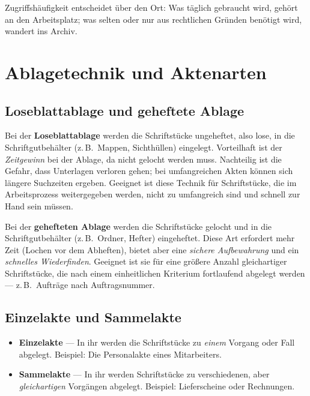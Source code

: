 \documentclass[11pt, a4paper]{article}
\begin{document}
\begin{merksatz}
Zugriffshäufigkeit entscheidet über den Ort: Was täglich gebraucht wird, gehört an den
Arbeitsplatz; was selten oder nur aus rechtlichen Gründen benötigt wird, wandert ins
Archiv.
\end{merksatz}

\section{Ablagetechnik und Aktenarten}

\subsection{Loseblattablage und geheftete Ablage}

Bei der \textbf{Loseblattablage} werden die Schriftstücke ungeheftet, also lose, in die
Schriftgutbehälter (z.\,B.\ Mappen, Sichthüllen) eingelegt. Vorteilhaft ist der
\emph{Zeitgewinn} bei der Ablage, da nicht gelocht werden muss. Nachteilig ist die Gefahr,
dass Unterlagen verloren gehen; bei umfangreichen Akten können sich längere Suchzeiten
ergeben. Geeignet ist diese Technik für Schriftstücke, die im Arbeitsprozess
weitergegeben werden, nicht zu umfangreich sind und schnell zur Hand sein müssen.

Bei der \textbf{gehefteten Ablage} werden die Schriftstücke gelocht und in die
Schriftgutbehälter (z.\,B.\ Ordner, Hefter) eingeheftet. Diese Art erfordert mehr Zeit
(Lochen vor dem Abheften), bietet aber eine \emph{sichere Aufbewahrung} und ein
\emph{schnelles Wiederfinden}. Geeignet ist sie für eine größere Anzahl gleichartiger
Schriftstücke, die nach einem einheitlichen Kriterium fortlaufend abgelegt werden ---
z.\,B.\ Aufträge nach Auftragsnummer.

\subsection{Einzelakte und Sammelakte}

\begin{itemize}
  \item \textbf{Einzelakte} --- In ihr werden die Schriftstücke zu \emph{einem} Vorgang
    oder Fall abgelegt. Beispiel: Die Personalakte eines Mitarbeiters.
  \item \textbf{Sammelakte} --- In ihr werden Schriftstücke zu verschiedenen, aber
    \emph{gleichartigen} Vorgängen abgelegt. Beispiel: Lieferscheine oder Rechnungen.
\end{itemize}
\end{document}
